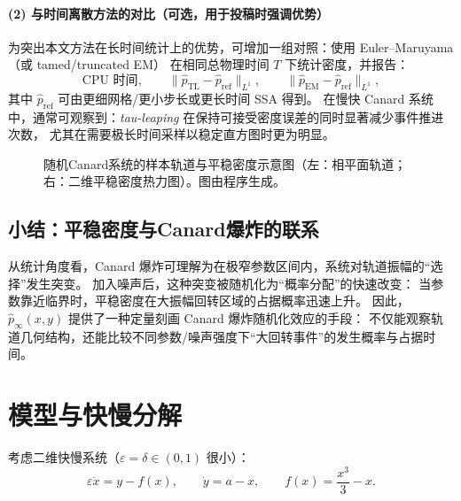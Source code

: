 	\paragraph{(2) 与时间离散方法的对比（可选，用于投稿时强调优势）}
	为突出本文方法在长时间统计上的优势，可增加一组对照：使用 Euler--Maruyama（或 tamed/truncated EM）
	在相同总物理时间 \(T\) 下统计密度，并报告：
	\[
	\text{CPU 时间},\qquad
	\|\hat p_{\mathrm{TL}}-\hat p_{\mathrm{ref}}\|_{L^1},\qquad
	\|\hat p_{\mathrm{EM}}-\hat p_{\mathrm{ref}}\|_{L^1},
	\]
	其中 \(\hat p_{\mathrm{ref}}\) 可由更细网格/更小步长或更长时间 SSA 得到。
	在慢快 Canard 系统中，通常可观察到：\textit{tau-leaping} 在保持可接受密度误差的同时显著减少事件推进次数，
	尤其在需要极长时间采样以稳定直方图时更为明显。
	
	\begin{figure}[htbp]
		\centering
		\caption{随机Canard系统的样本轨道与平稳密度示意图（左：相平面轨道；右：二维平稳密度热力图）。图由程序生成。}
		\label{fig:canard_density}
	\end{figure}
	
	\subsection{小结：平稳密度与Canard爆炸的联系}
	
	从统计角度看，Canard 爆炸可理解为在极窄参数区间内，系统对轨道振幅的“选择”发生突变。
	加入噪声后，这种突变被随机化为“概率分配”的快速改变：
	当参数靠近临界时，平稳密度在大振幅回转区域的占据概率迅速上升。
	因此，\(\hat p_\infty(x,y)\) 提供了一种定量刻画 Canard 爆炸随机化效应的手段：
	不仅能观察轨道几何结构，还能比较不同参数/噪声强度下“大回转事件”的发生概率与占据时间。
	
	\section{模型与快慢分解}
	
	考虑二维快慢系统（$\varepsilon=\delta\in(0,1)$ 很小）：
	\begin{equation}\label{eq:model}
		\varepsilon \dot x = y - f(x),\qquad \dot y = a-x,
		\qquad f(x)=\frac{x^3}{3}-x .
	\end{equation}
	
